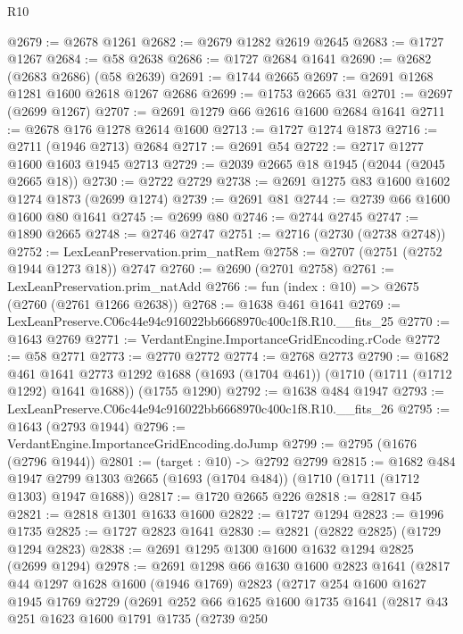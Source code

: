 \begin{lexlean}{R10}
\begin{coremodule}
@2679 := @2678 @1261
@2682 := @2679 @1282 @2619 @2645
@2683 := @1727 @1267
@2684 := @58 @2638
@2686 := @1727 @2684 @1641
@2690 := @2682 (@2683 @2686) (@58 @2639)
@2691 := @1744 @2665
@2697 := @2691 @1268 @1281 @1600 @2618 @1267 @2686
@2699 := @1753 @2665 @31
@2701 := @2697 (@2699 @1267)
@2707 := @2691 @1279 @66 @2616 @1600 @2684 @1641
@2711 := @2678 @176 @1278 @2614 @1600
@2713 := @1727 @1274 @1873
@2716 := @2711 (@1946 @2713) @2684
@2717 := @2691 @54
@2722 := @2717 @1277 @1600 @1603 @1945 @2713
@2729 := @2039 @2665 @18 @1945 (@2044 (@2045 @2665 @18))
@2730 := @2722 @2729
@2738 := @2691 @1275 @83 @1600 @1602 @1274 @1873 (@2699 @1274)
@2739 := @2691 @81
@2744 := @2739 @66 @1600 @1600 @80 @1641
@2745 := @2699 @80
@2746 := @2744 @2745
@2747 := @1890 @2665
@2748 := @2746 @2747
@2751 := @2716 (@2730 (@2738 @2748))
@2752 := LexLeanPreservation.prim_natRem
@2758 := @2707 (@2751 (@2752 @1944 @1273 @18)) @2747
@2760 := @2690 (@2701 @2758)
@2761 := LexLeanPreservation.prim_natAdd
@2766 := fun (index : @10) => @2675 (@2760 (@2761 @1266 @2638))
@2768 := @1638 @461 @1641
@2769 := LexLeanPreserve.C06c44e94c916022bb6668970c400c1f8.R10.__fits_25
@2770 := @1643 @2769
@2771 := VerdantEngine.ImportanceGridEncoding.rCode
@2772 := @58 @2771
@2773 := @2770 @2772
@2774 := @2768 @2773
@2790 := @1682
    @461
    @1641
    @2773
    @1292
    @1688
    (@1693 (@1704 @461))
    (@1710 (@1711 (@1712 @1292) @1641 @1688))
    (@1755 @1290)
@2792 := @1638 @484 @1947
@2793 := LexLeanPreserve.C06c44e94c916022bb6668970c400c1f8.R10.__fits_26
@2795 := @1643 (@2793 @1944)
@2796 := VerdantEngine.ImportanceGridEncoding.doJump
@2799 := @2795 (@1676 (@2796 @1944))
@2801 := (target : @10) -> @2792 @2799
@2815 := @1682
    @484
    @1947
    @2799
    @1303
    @2665
    (@1693 (@1704 @484))
    (@1710 (@1711 (@1712 @1303) @1947 @1688))
@2817 := @1720 @2665 @226
@2818 := @2817 @45
@2821 := @2818 @1301 @1633 @1600
@2822 := @1727 @1294
@2823 := @1996 @1735
@2825 := @1727 @2823 @1641
@2830 := @2821 (@2822 @2825) (@1729 @1294 @2823)
@2838 := @2691 @1295 @1300 @1600 @1632 @1294 @2825 (@2699 @1294)
@2978 := @2691
    @1298
    @66
    @1630
    @1600
    @2823
    @1641
    (@2817
      @44
      @1297
      @1628
      @1600
      (@1946 @1769)
      @2823
      (@2717
        @254
        @1600
        @1627
        @1945
        @1769
        @2729
        (@2691
          @252
          @66
          @1625
          @1600
          @1735
          @1641
          (@2817
            @43
            @251
            @1623
            @1600
            @1791
            @1735
            (@2739
              @250

\end{coremodule}
\end{lexlean}
